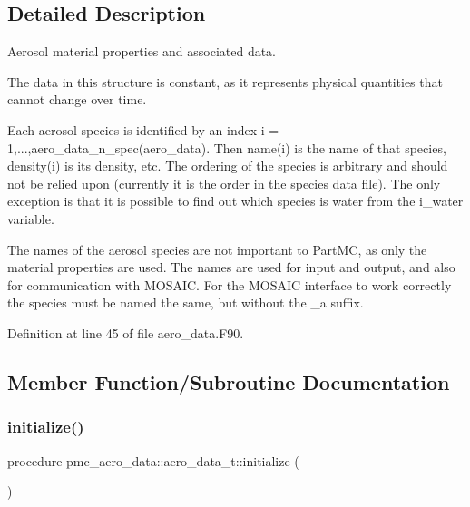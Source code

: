 \subsection{Detailed Description}
Aerosol material properties and associated data. 

The data in this structure is constant, as it represents physical quantities that cannot change over time.

Each aerosol species is identified by an index {\ttfamily i = 1,...,aero\+\_\+data\+\_\+n\+\_\+spec(aero\+\_\+data)}. Then {\ttfamily name(i)} is the name of that species, {\ttfamily density(i)} is its density, etc. The ordering of the species is arbitrary and should not be relied upon (currently it is the order in the species data file). The only exception is that it is possible to find out which species is water from the {\ttfamily i\+\_\+water} variable.

The names of the aerosol species are not important to Part\+MC, as only the material properties are used. The names are used for input and output, and also for communication with M\+O\+S\+A\+IC. For the M\+O\+S\+A\+IC interface to work correctly the species must be named the same, but without the {\ttfamily \+\_\+a} suffix. 

Definition at line 45 of file aero\+\_\+data.\+F90.



\subsection{Member Function/\+Subroutine Documentation}
\mbox{\label{structpmc__aero__data_1_1aero__data__t_a7c85cc32aa34208d32d039be9e7c803d}} 
\subsubsection{\texorpdfstring{initialize()}{initialize()}}
{\footnotesize\ttfamily procedure pmc\+\_\+aero\+\_\+data\+::aero\+\_\+data\+\_\+t\+::initialize (\begin{DoxyParamCaption}{ }\end{DoxyParamCaption})}



